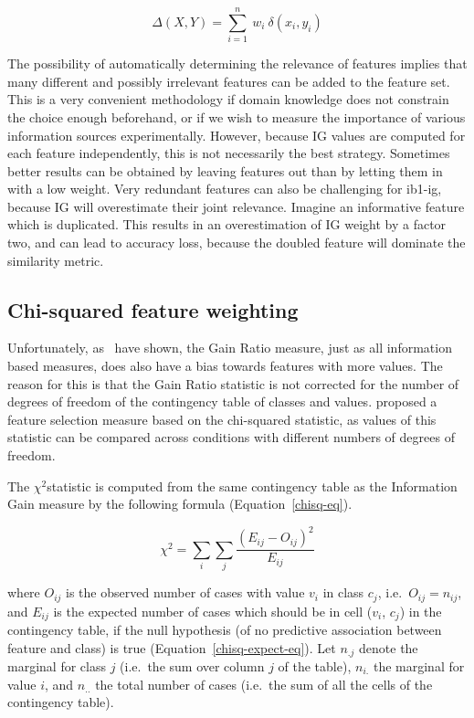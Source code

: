 \documentclass{report}
\newcommand{\chisq}{{$ \chi^2 $}}
\begin{document}
\begin{equation}
\Delta(X,Y) = \sum_{i=1}^{n}\ w_{i} \ \delta(x_{i},y_{i})
\label{distancew}
\end{equation} 

The possibility of automatically determining the relevance of features
implies that many different and possibly irrelevant features can be
added to the feature set. This is a very convenient methodology if
domain knowledge does not constrain the choice enough beforehand, or
if we wish to measure the importance of various information sources
experimentally. However, because IG values are computed for each
feature independently, this is not necessarily the best
strategy. Sometimes better results can be obtained by leaving features
out than by letting them in with a low weight. Very redundant features
can also be challenging for {\sc ib1-ig}, because IG will overestimate
their joint relevance. Imagine an informative feature which is
duplicated. This results in an overestimation of IG weight by a factor
two, and can lead to accuracy loss, because the doubled feature will
dominate the similarity metric.

\subsection{Chi-squared feature weighting}
\label{chisquared}

Unfortunately, as~\cite{White+94} have shown, the Gain Ratio
measure, just as all information based measures, does also have a bias
towards features with more values. The reason for this is that the
Gain Ratio statistic is not corrected for the number of degrees
of freedom of the contingency table of classes and
values. \cite{White+94} proposed a feature selection measure based
on the chi-squared statistic, as values of this statistic can be
compared across conditions with different numbers of degrees of
freedom. 

The \chisq statistic is computed from the same contingency table as
the Information Gain measure by the following formula
(Equation~\ref{chisq-eq}).

\begin{equation} 
\chi^{2} = \sum_{i} \sum_{j} \frac{(E_{ij} - O_{ij})^{2}}
				  {E_{ij}} 
\label{chisq-eq}
\end{equation} 

where $O_{ij}$ is the observed number of cases with value $v_{i}$ in
class $c_{j}$, i.e.~$O_{ij} = n_{ij}$, and $E_{ij}$ is the expected
number of cases which should be in cell ($v_{i}$, $c_{j}$) in the
contingency table, if the null hypothesis (of no predictive
association between feature and class) is true
(Equation~\ref{chisq-expect-eq}). Let $n_{.j}$ denote the marginal for
class $j$ (i.e.~the sum over column $j$ of the table), $n_{i.}$ the
marginal for value $i$, and $n_{..}$ the total number of cases
(i.e.~the sum of all the cells of the contingency table).
\end{document}
